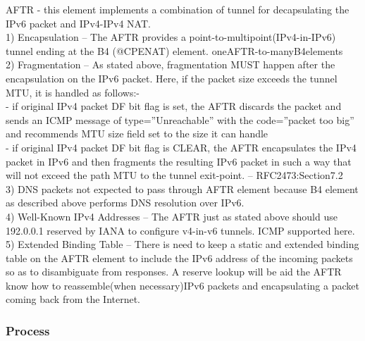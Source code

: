 \documentclass[iwp,first]{luthesis}
\begin{document}
AFTR - this element implements a combination of tunnel for decapsulating the IPv6 packet and IPv4-IPv4 NAT.
\\1) Encapsulation – The AFTR provides a point-to-multipoint(IPv4-in-IPv6) tunnel ending at the B4 (@CPENAT) element. oneAFTR-to-manyB4elements
\\2) Fragmentation – As stated above, fragmentation MUST happen after the encapsulation on the IPv6 packet. Here, if the packet size exceeds the tunnel MTU, it is handled as follows:-
\\- if original IPv4 packet DF bit flag is set, the AFTR discards the packet and sends an ICMP message of type=”Unreachable” with the code=”packet too big” and recommends MTU size field set to the size it can handle
\\- if original IPv4 packet DF bit flag is CLEAR, the AFTR encapsulates the IPv4 packet in IPv6 and then fragments the resulting IPv6 packet in such a way that will not exceed the path MTU to the tunnel exit-point. – RFC2473:Section7.2
\\3) DNS packets not expected to pass through AFTR element because B4 element as described above performs DNS resolution over IPv6.
\\4) Well-Known IPv4 Addresses – The AFTR just as stated above should use 192.0.0.1 reserved by IANA to configure v4-in-v6 tunnels. ICMP supported here.
\\5) Extended Binding Table – There is need to keep a static and extended binding table on the AFTR element to include the IPv6 address of the incoming packets so as to disambiguate from responses. A reserve lookup will be aid the AFTR know how to reassemble(when necessary)IPv6 packets and encapsulating a packet coming back from the Internet.



\subsubsection {Process}

\end{document}
